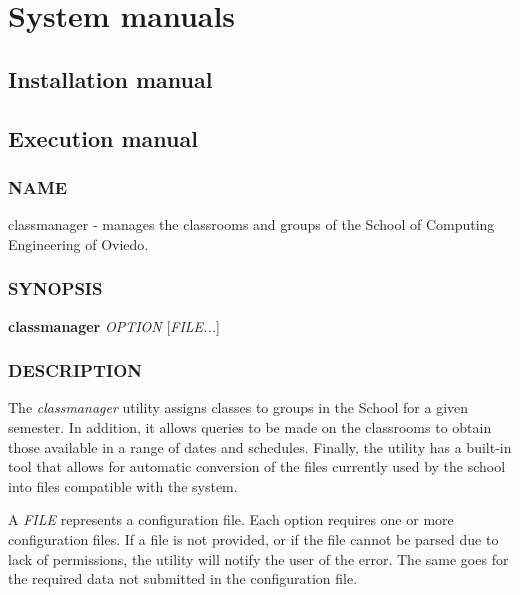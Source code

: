 \renewcommand{\documentname}{System manuals}

\chapter{System manuals}


\section{Installation manual}



\section{Execution manual}


\subsection*{NAME}

\begin{description}
    \item classmanager - manages the classrooms and groups of the School of Computing Engineering of Oviedo.
\end{description}


\subsection*{SYNOPSIS}

\begin{description}
    \item \textbf{classmanager} \textit{OPTION} [\textit{FILE...}]
\end{description}


\subsection*{DESCRIPTION}

The \textit{classmanager} utility assigns classes to groups in the School for a given semester. In addition, it allows queries to be made on the classrooms to obtain those available in a range of dates and schedules. Finally, the utility has a built-in tool that allows for automatic conversion of the files currently used by the school into files compatible with the system. 

A \textit{FILE} represents a configuration file. Each option requires one or more configuration files. If a file is not provided, or if the file cannot be parsed due to lack of permissions, the utility will notify the user of the error. The same goes for the required data not submitted in the configuration file. 


